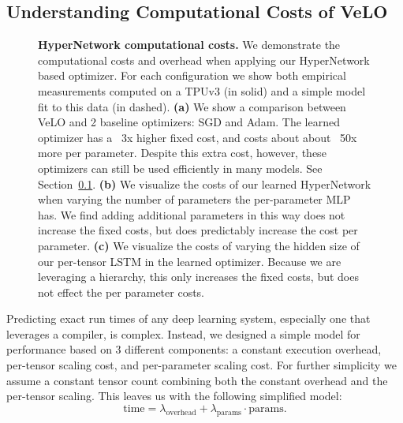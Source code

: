 \documentclass[11pt]{article}
\begin{document}
\subsection{Understanding Computational Costs of VeLO} \label{app:computational_costs_of_lopt}
\begin{figure}
    \centering
    \vspace{-1em}
    \caption{\textbf{HyperNetwork computational costs.} We demonstrate the computational costs and overhead when applying our HyperNetwork based optimizer.
    For each configuration we show both empirical measurements computed on a TPUv3 (in solid) and a simple model fit to this data (in dashed).
    \textbf{(a)} We show a comparison between VeLO and 2 baseline optimizers: SGD and Adam. The learned optimizer has a ~3x higher fixed cost, and costs about about ~50x more per parameter. Despite this extra cost, however, these optimizers can still be used efficiently in many models. See Section~\ref{app:computational_costs_of_lopt}. \textbf{(b)} We visualize the costs of our learned HyperNetwork when varying the number of parameters the per-parameter MLP has.
    We find adding additional parameters in this way does not increase the fixed costs, but does predictably increase the cost per parameter.
    \textbf{(c)} We visualize the costs of varying the hidden size of our per-tensor LSTM in the learned optimizer.
    Because we are leveraging a hierarchy, this only increases the fixed costs, but does not effect the per parameter costs.
    \label{fig:timing}
    }
\end{figure}

Predicting exact run times of any deep learning system, especially one that leverages a compiler, is complex.
Instead, we designed a simple model for performance based on 3 different components: a constant execution overhead, per-tensor scaling cost, and per-parameter scaling cost. For further simplicity we assume a constant tensor count combining both the constant overhead and the per-tensor scaling. This leaves us with the following simplified model:
\begin{equation}
    \text{time} = \lambda_{\text{overhead}} + \lambda_{\text{params}} \cdot \text{params}.
\end{equation}
\end{document}
